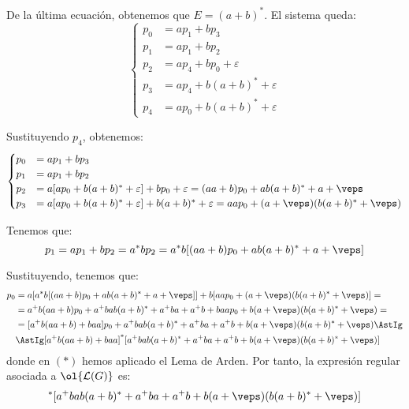 \begin{ejercicio}
    De la última ecuación, obtenemos que $E = (a+b)^*$. El sistema queda:
    \begin{equation*}
        \begin{cases}
            p_0 &= ap_1 + bp_3\\
            p_1 &= ap_1 + bp_2\\
            p_2 &= ap_4 + bp_0 + \varepsilon\\
            p_3 &= ap_4 + b(a+b)^* + \varepsilon\\
            p_4 &= ap_0 + b(a+b)^* + \varepsilon
        \end{cases}
    \end{equation*}

    Sustituyendo $p_4$, obtenemos:
    \begin{equation*}
        \begin{cases}
            p_0 &= ap_1 + bp_3\\
            p_1 &= ap_1 + bp_2\\
            p_2 &= a[ap_0 + b(a+b)^* + \varepsilon] + bp_0 + \varepsilon = (aa+b)p_0 + ab(a+b)^* + a+\veps\\
            p_3 &= a[ap_0 + b(a+b)^* + \varepsilon] + b(a+b)^* + \varepsilon = aap_0 + (a+\veps)(b(a+b)^* + \veps)\\
        \end{cases}
    \end{equation*}

    Tenemos que:
    \begin{equation*}
        p_1 = ap_1 + bp_2 = a^*bp_2
        = a^*b[(aa+b)p_0 + ab(a+b)^* + a+\veps]
    \end{equation*}

    Sustituyendo, tenemos que:
    \begin{align*}
        p_0 &= a[a^*b[(aa+b)p_0 + ab(a+b)^* + a+\veps]] + b[aap_0 + (a+\veps)(b(a+b)^* + \veps)] =\\
        &= a^+b(aa+b)p_0 + a^+bab(a+b)^* + a^+ba + a^+b + baap_0 + b(a+\veps)(b(a+b)^* + \veps) =\\
        &= [a^+b(aa+b)+baa]p_0 + a^+bab(a+b)^* + a^+ba + a^+b + b(a+\veps)(b(a+b)^* + \veps) \AstIg\\
        & \AstIg [a^+b(aa+b)+baa]^*[a^+bab(a+b)^* + a^+ba + a^+b + b(a+\veps)(b(a+b)^* + \veps)]
    \end{align*}
    donde en $(\ast)$ hemos aplicado el Lema de Arden.
    Por tanto, la expresión regular asociada a $\ol{\cc{L}(G)}$ es:
    \begin{equation*}
        [a^+b(aa+b)+baa]^*[a^+bab(a+b)^* + a^+ba + a^+b + b(a+\veps)(b(a+b)^* + \veps)]
    \end{equation*}
\end{ejercicio}

